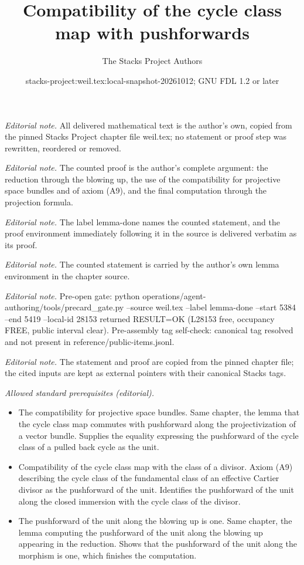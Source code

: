 \documentclass[10pt,a4paper]{amsart}
\title{Compatibility of the cycle class map with pushforwards}
\author{The Stacks Project Authors}
\date{stacks-project:weil.tex:local-snapshot-20261012; GNU FDL 1.2 or later}
\theoremstyle{plain}
\theoremstyle{definition}
\theoremstyle{remark}
\numberwithin{equation}{subsection}
\begin{document}
\maketitle
\noindent\textit{Editorial note.} All delivered mathematical text is the author's own, copied from the pinned Stacks Project chapter file weil.tex; no statement or proof step was rewritten, reordered or removed.\par\medskip
\noindent\textit{Editorial note.} The counted proof is the author's complete argument: the reduction through the blowing up, the use of the compatibility for projective space bundles and of axiom (A9), and the final computation through the projection formula.\par\medskip
\noindent\textit{Editorial note.} The label lemma-done names the counted statement, and the proof environment immediately following it in the source is delivered verbatim as its proof.\par\medskip
\noindent\textit{Editorial note.} The counted statement is carried by the author's own lemma environment in the chapter source.\par\medskip
\noindent\textit{Editorial note.} Pre-open gate: python operations/agent-authoring/tools/precard\_gate.py --source weil.tex --label lemma-done --start 5384 --end 5419 --local-id 28153 returned RESULT=OK (L28153 free, occupancy FREE, public interval clear). Pre-assembly tag self-check: canonical tag resolved and not present in reference/public-items.jsonl.\par\medskip
\noindent\textit{Editorial note.} The statement and proof are copied from the pinned chapter file; the cited inputs are kept as external pointers with their canonical Stacks tags.\par\medskip
\noindent\textit{Allowed standard prerequisites (editorial).}\begin{itemize}
\item The compatibility for projective space bundles. Same chapter, the lemma that the cycle class map commutes with pushforward along the projectivization of a vector bundle. Supplies the equality expressing the pushforward of the cycle class of a pulled back cycle as the unit.
\item Compatibility of the cycle class map with the class of a divisor. Axiom (A9) describing the cycle class of the fundamental class of an effective Cartier divisor as the pushforward of the unit. Identifies the pushforward of the unit along the closed immersion with the cycle class of the divisor.
\item The pushforward of the unit along the blowing up is one. Same chapter, the lemma computing the pushforward of the unit along the blowing up appearing in the reduction. Shows that the pushforward of the unit along the morphism is one, which finishes the computation.
\end{itemize}\medskip
\end{document}
